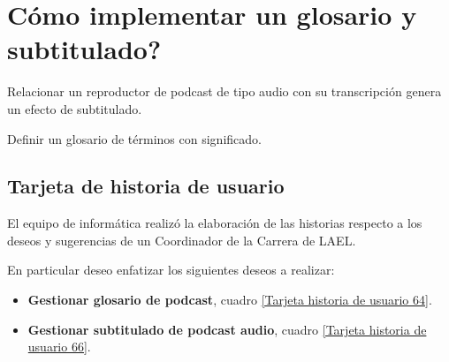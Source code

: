 \section{\textquestiondown Cómo implementar un glosario y subtitulado?}

Relacionar un reproductor de podcast de tipo audio con su transcripción
genera un efecto de subtitulado. 

Definir un glosario de términos con significado.
 
\subsection{Tarjeta de historia de usuario}

El equipo de informática realizó la elaboración de las historias respecto
a los deseos y sugerencias de un Coordinador de la Carrera de LAEL.

En particular deseo enfatizar los siguientes deseos a realizar:

\begin{itemize}

\item \textbf{Gestionar glosario de podcast}, cuadro
\ref{Tarjeta historia de usuario 64}.
\item \textbf{Gestionar subtitulado de podcast audio}, cuadro 
\ref{Tarjeta historia de usuario 66}.

\end{itemize}

